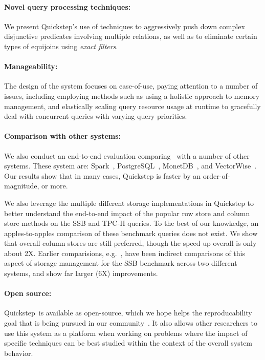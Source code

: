 \paragraph{Novel query processing techniques:} We present Quickstep's use of techniques to aggressively push down complex disjunctive predicates involving multiple relations, as well as to eliminate certain types of equijoins using \textit{exact filters}.

\paragraph{Manageability:} The design of the system focuses on ease-of-use, paying attention to a number of issues, including employing methods such as using a holistic approach to memory management, and elastically scaling query resource usage at runtime to gracefully deal with concurrent queries with varying query priorities.

\paragraph{Comparison with other systems:} We also conduct an end-to-end evaluation comparing \Quickstep\ with a number of other systems. These system are: Spark~\cite{Spark, SparkSQL}, PostgreSQL~\cite{postgres}, MonetDB~\cite{monetdb}, and VectorWise~\cite{vectorwise}. Our results show that in many cases, Quickstep is faster by an order-of-magnitude, or more.

We also leverage the multiple different storage implementations in Quickstep to better understand the end-to-end impact of the popular row store and column store methods on the SSB and TPC-H queries. To the best of our knowkedge, an apples-to-apples comparison of these benchmark queries does not exist. We show that overall column stores are still preferred, though the speed up overall is only about 2X. Earlier comparisions, e.g.~\cite{AbadiMH08}, have been indirect comparisons of this aspect of storage management for the SSB benchmark across two different systems, and show far larger (6X) improvements. %

\paragraph{Open source:} Quickstep\ is available as open-source, which we hope helps the reproducability goal that is being pursued in our community~\cite{BonnetMBCGGHIIJKKMOPRTYFS11, ManegoldMAFGHHKKLLORSSWS09, ManolescuAADMPSSZS08}. It also allows other researchers to use this system as a platform when working on  problems where the impact of specific techniques can be best studied within the context of the overall system behavior.

